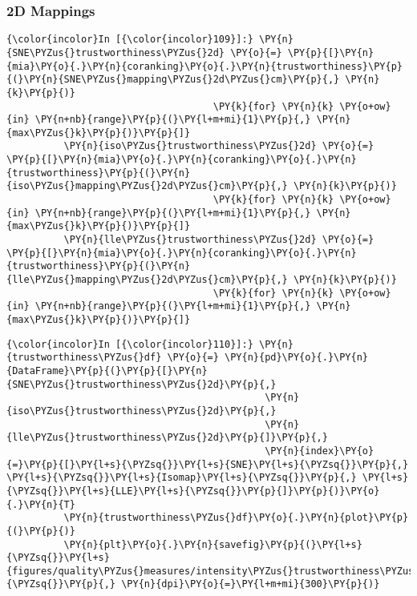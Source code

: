     \subsubsection{2D Mappings}\label{d-mappings}

    \begin{Verbatim}[commandchars=\\\{\}]
{\color{incolor}In [{\color{incolor}109}]:} \PY{n}{SNE\PYZus{}trustworthiness\PYZus{}2d} \PY{o}{=} \PY{p}{[}\PY{n}{mia}\PY{o}{.}\PY{n}{coranking}\PY{o}{.}\PY{n}{trustworthiness}\PY{p}{(}\PY{n}{SNE\PYZus{}mapping\PYZus{}2d\PYZus{}cm}\PY{p}{,} \PY{n}{k}\PY{p}{)}
                                    \PY{k}{for} \PY{n}{k} \PY{o+ow}{in} \PY{n+nb}{range}\PY{p}{(}\PY{l+m+mi}{1}\PY{p}{,} \PY{n}{max\PYZus{}k}\PY{p}{)}\PY{p}{]}
          \PY{n}{iso\PYZus{}trustworthiness\PYZus{}2d} \PY{o}{=} \PY{p}{[}\PY{n}{mia}\PY{o}{.}\PY{n}{coranking}\PY{o}{.}\PY{n}{trustworthiness}\PY{p}{(}\PY{n}{iso\PYZus{}mapping\PYZus{}2d\PYZus{}cm}\PY{p}{,} \PY{n}{k}\PY{p}{)}
                                    \PY{k}{for} \PY{n}{k} \PY{o+ow}{in} \PY{n+nb}{range}\PY{p}{(}\PY{l+m+mi}{1}\PY{p}{,} \PY{n}{max\PYZus{}k}\PY{p}{)}\PY{p}{]}
          \PY{n}{lle\PYZus{}trustworthiness\PYZus{}2d} \PY{o}{=} \PY{p}{[}\PY{n}{mia}\PY{o}{.}\PY{n}{coranking}\PY{o}{.}\PY{n}{trustworthiness}\PY{p}{(}\PY{n}{lle\PYZus{}mapping\PYZus{}2d\PYZus{}cm}\PY{p}{,} \PY{n}{k}\PY{p}{)}
                                    \PY{k}{for} \PY{n}{k} \PY{o+ow}{in} \PY{n+nb}{range}\PY{p}{(}\PY{l+m+mi}{1}\PY{p}{,} \PY{n}{max\PYZus{}k}\PY{p}{)}\PY{p}{]}
\end{Verbatim}

    \begin{Verbatim}[commandchars=\\\{\}]
{\color{incolor}In [{\color{incolor}110}]:} \PY{n}{trustworthiness\PYZus{}df} \PY{o}{=} \PY{n}{pd}\PY{o}{.}\PY{n}{DataFrame}\PY{p}{(}\PY{p}{[}\PY{n}{SNE\PYZus{}trustworthiness\PYZus{}2d}\PY{p}{,}
                                             \PY{n}{iso\PYZus{}trustworthiness\PYZus{}2d}\PY{p}{,}
                                             \PY{n}{lle\PYZus{}trustworthiness\PYZus{}2d}\PY{p}{]}\PY{p}{,}
                                             \PY{n}{index}\PY{o}{=}\PY{p}{[}\PY{l+s}{\PYZsq{}}\PY{l+s}{SNE}\PY{l+s}{\PYZsq{}}\PY{p}{,} \PY{l+s}{\PYZsq{}}\PY{l+s}{Isomap}\PY{l+s}{\PYZsq{}}\PY{p}{,} \PY{l+s}{\PYZsq{}}\PY{l+s}{LLE}\PY{l+s}{\PYZsq{}}\PY{p}{]}\PY{p}{)}\PY{o}{.}\PY{n}{T}
          \PY{n}{trustworthiness\PYZus{}df}\PY{o}{.}\PY{n}{plot}\PY{p}{(}\PY{p}{)}
          \PY{n}{plt}\PY{o}{.}\PY{n}{savefig}\PY{p}{(}\PY{l+s}{\PYZsq{}}\PY{l+s}{figures/quality\PYZus{}measures/intensity\PYZus{}trustworthiness\PYZus{}2d.png}\PY{l+s}{\PYZsq{}}\PY{p}{,} \PY{n}{dpi}\PY{o}{=}\PY{l+m+mi}{300}\PY{p}{)}
\end{Verbatim}

